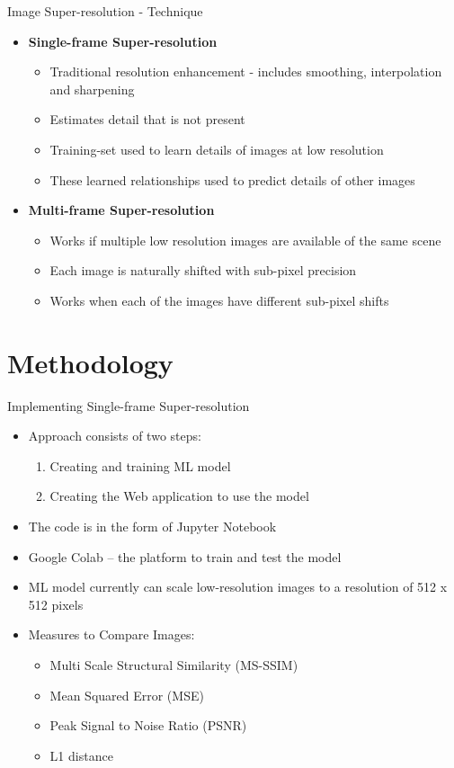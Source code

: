 \documentclass{beamer}
\begin{document}
	\begin{frame}{Image Super-resolution - Technique}
		\begin{itemize}
			\item \textbf{Single-frame Super-resolution}
			\begin{itemize}
				\item Traditional resolution enhancement  - includes smoothing, interpolation and sharpening
				\item Estimates detail that is not present
				\item Training-set used to learn details of images at low resolution
				\item These learned relationships used to predict details of other images
			\end{itemize}
			\item \textbf{Multi-frame Super-resolution}
			\begin{itemize}
				\item Works if multiple low resolution images are available of the same scene
				\item Each image is naturally shifted with sub-pixel precision
				\item Works when each of the images have different sub-pixel shifts
			\end{itemize}
		\end{itemize}
	\end{frame}


\section{Methodology}
	\begin{frame}{Implementing Single-frame Super-resolution}
		\begin{itemize}
			\item Approach consists of two steps:
			\begin{enumerate}
				\item Creating and training ML model
				\item Creating the Web application to use the model
			\end{enumerate}
			\item The code is in the form of Jupyter Notebook
			\item Google Colab -- the platform to train and test
			the model
			\item ML model currently can scale low-resolution images to a resolution of 512 x 512 pixels
			\item Measures to Compare Images:
			\begin{itemize}
				\item Multi Scale Structural Similarity (MS-SSIM)
				\item Mean Squared Error (MSE)
				\item Peak Signal to Noise Ratio (PSNR)
				\item L1 distance
			\end{itemize}
		\end{itemize}
	\end{frame}
\end{document}
